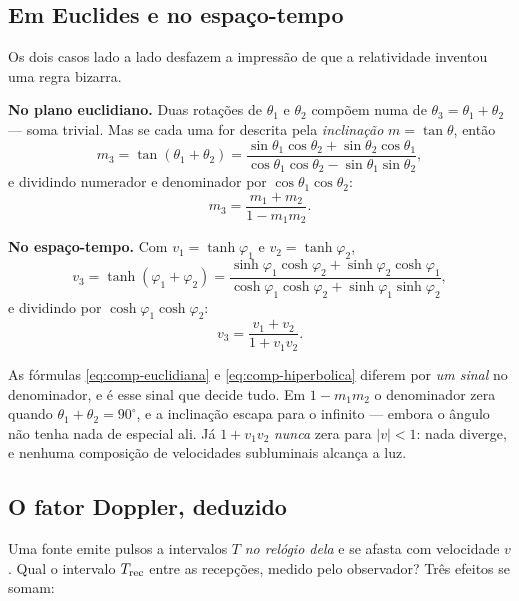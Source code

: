 \documentclass[12pt,a4paper,oneside]{book}
\theoremstyle{rgplain}
\theoremstyle{rgremark}
\begin{document}
\subsection*{Em Euclides e no espaço-tempo}

Os dois casos lado a lado desfazem a impressão de que a relatividade inventou
uma regra bizarra.

\textbf{No plano euclidiano.} Duas rotações de $\theta_1$ e $\theta_2$ compõem
numa de $\theta_3=\theta_1+\theta_2$ --- soma trivial. Mas se cada uma for
descrita pela \emph{inclinação} $m=\tan\theta$, então
\[
  m_3=\tan(\theta_1+\theta_2)
     =\frac{\sin\theta_1\cos\theta_2+\sin\theta_2\cos\theta_1}
            {\cos\theta_1\cos\theta_2-\sin\theta_1\sin\theta_2},
\]
e dividindo numerador e denominador por $\cos\theta_1\cos\theta_2$:
\begin{equation}
  m_3=\frac{m_1+m_2}{1-m_1m_2}.
  \label{eq:comp-euclidiana}
\end{equation}

\textbf{No espaço-tempo.} Com $v_1=\tanh\varphi_1$ e $v_2=\tanh\varphi_2$,
\[
  v_3=\tanh(\varphi_1+\varphi_2)
     =\frac{\sinh\varphi_1\cosh\varphi_2+\sinh\varphi_2\cosh\varphi_1}
            {\cosh\varphi_1\cosh\varphi_2+\sinh\varphi_1\sinh\varphi_2},
\]
e dividindo por $\cosh\varphi_1\cosh\varphi_2$:
\begin{equation}
  v_3=\frac{v_1+v_2}{1+v_1v_2}.
  \label{eq:comp-hiperbolica}
\end{equation}

\begin{atencao}[title={\sffamily\bfseries\footnotesize\color{rgTerracota}UM SINAL, DUAS FÍSICAS}]
As fórmulas \eqref{eq:comp-euclidiana} e \eqref{eq:comp-hiperbolica} diferem
por \emph{um sinal} no denominador, e é esse sinal que decide tudo. Em
$1-m_1m_2$ o denominador zera quando $\theta_1+\theta_2=90^\circ$, e a
inclinação escapa para o infinito --- embora o ângulo não tenha nada de
especial ali. Já $1+v_1v_2$ \emph{nunca} zera para $|v|<1$: nada diverge, e
nenhuma composição de velocidades subluminais alcança a luz.
\end{atencao}

\subsection*{O fator Doppler, deduzido}

Uma fonte emite pulsos a intervalos $T$ \emph{no relógio dela} e se afasta com
velocidade $v$. Qual o intervalo $T_{\rm rec}$ entre as recepções, medido pelo
observador? Três efeitos se somam:
\end{document}
